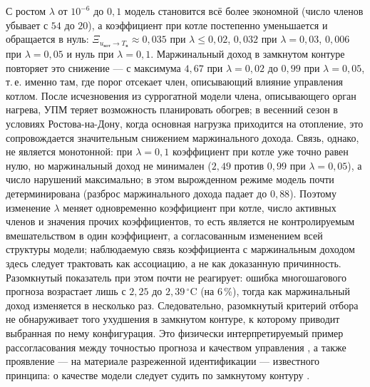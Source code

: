 \documentclass[12pt,a4paper,leqno]{article}
\newcommand{\Tin}{T_{\text{в}}}          %
\newcommand{\uBoil}{u_{\text{кот}}}       %
\begin{document}
С ростом $\lambda$ от $10^{-6}$ до $0{,}1$ модель становится всё более экономной (число
членов убывает с $54$ до $20$), а коэффициент при котле постепенно уменьшается и
обращается в нуль: $\Xi_{\uBoil\to \Tin}\approx0{,}035$ при $\lambda\le0{,}02$, $0{,}032$
при $\lambda=0{,}03$, $0{,}006$ при $\lambda=0{,}05$ и нуль при $\lambda=0{,}1$. Маржинальный доход
в замкнутом контуре повторяет это снижение — с максимума $4{,}67$ при $\lambda=0{,}02$
до $0{,}99$ при $\lambda=0{,}05$, т.\,е. именно там, где порог отсекает член, описывающий влияние управления котлом.
После исчезновения из суррогатной модели члена, описывающего орган нагрева, УПМ теряет
возможность планировать обогрев; в весенний сезон в условиях Ростова-на-Дону, когда
основная нагрузка приходится на отопление, это сопровождается значительным снижением
маржинального дохода. Связь, однако, не является монотонной: при $\lambda=0{,}1$ коэффициент при котле
уже точно равен нулю, но маржинальный доход не минимален ($2{,}49$ против $0{,}99$ при
$\lambda=0{,}05$), а число нарушений максимально; в этом вырожденном режиме модель почти
детерминирована (разброс маржинального дохода падает до $0{,}88$). Поэтому изменение $\lambda$ меняет
одновременно коэффициент при котле, число активных членов и значения прочих
коэффициентов, то есть является не контролируемым вмешательством в один коэффициент, а
согласованным изменением всей структуры модели; наблюдаемую связь коэффициента с маржинальным доходом
здесь следует трактовать как ассоциацию, а не как доказанную причинность. Разомкнутый
показатель при этом почти не реагирует: ошибка многошагового прогноза возрастает лишь с
$2{,}25$ до $2{,}39\,^\circ$C (на $6\,\%$), тогда как маржинальный доход изменяется в несколько раз.
Следовательно, разомкнутый критерий отбора не обнаруживает того ухудшения в замкнутом
контуре, к которому приводит выбранная по нему конфигурация. Это физически интерпретируемый пример
рассогласования между точностью прогноза и качеством управления
\cite{lambert2020,jackson2022}, а также проявление — на материале разреженной
идентификации — известного принципа: о качестве модели следует судить по замкнутому
контуру \cite{gevers1993,vandenhof1995}.
\end{document}
